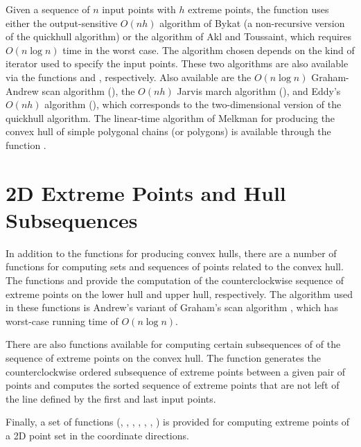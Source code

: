 Given a sequence of $n$ input points with $h$ extreme points,
the function 
uses either the output-sensitive $O(n h)$ algorithm of Bykat \cite{b-chfsp-78}
(a non-recursive version of the quickhull \cite{bdh-qach-96} algorithm)%
or the algorithm of Akl and Toussaint, which requires $O(n \log n)$ time
in the worst case.  The algorithm chosen depends on the kind of 
iterator used to specify the input points.  These two algorithms are
also available via the functions  and ,
respectively.  Also available are 
the $O(n \log n)$ Graham-Andrew scan algorithm \cite{a-aeach-79,m-mdscg-84} 
(), 
the $O(n h)$ Jarvis march algorithm \cite{j-ichfs-73}
(),
and Eddy's $O(n h)$ algorithm \cite{e-nchap-77}
(), which corresponds to the 
two-dimensional version of the quickhull algorithm.
The linear-time algorithm of Melkman for producing the convex hull of 
simple polygonal chains (or polygons) is available through the function
.%

\section{2D Extreme Points and Hull Subsequences}
In addition to the functions for producing convex hulls, there are a
number of functions for computing sets and sequences of points related
to the convex hull.  
The functions 
and 
provide the computation of the counterclockwise 
sequence of extreme points on the lower hull and upper hull,
respectively.  The algorithm used in these functions is
Andrew's variant of Graham's scan algorithm \cite{a-aeach-79,m-mdscg-84},
which has worst-case running time of $O(n \log n)$.

There are also functions available for computing certain subsequences of
of the sequence of extreme points on the convex hull.  The function
generates the counterclockwise ordered subsequence of
extreme points between a given pair of points and
computes the sorted sequence of extreme points that are
not left of the line defined by the first and last input points.

Finally, a set of functions 
(, , , ,
, , )
is provided for computing extreme points of a 
2D point set in the coordinate directions.%
